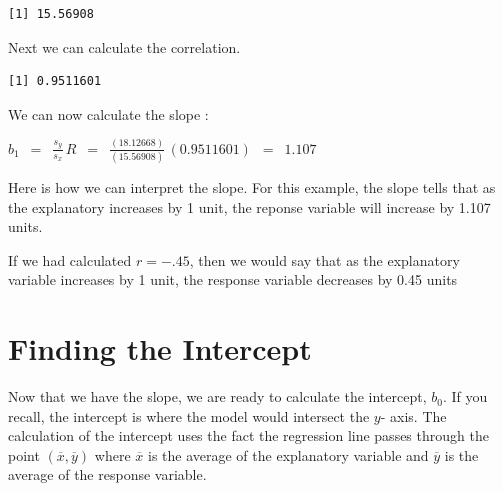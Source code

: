 \documentclass[
  letterpaper,
  DIV=11,
  numbers=noendperiod]{scrreprt}
\newenvironment{Shaded}{\begin{snugshade}}{\end{snugshade}}
\newcommand{\FunctionTok}[1]{\textcolor[rgb]{0.28,0.35,0.67}{#1}}
\newcommand{\NormalTok}[1]{\textcolor[rgb]{0.00,0.23,0.31}{#1}}
\newcommand{\SpecialCharTok}[1]{\textcolor[rgb]{0.37,0.37,0.37}{#1}}
\begin{document}
\begin{verbatim}
[1] 15.56908
\end{verbatim}

Next we can calculate the correlation.

\begin{Shaded}
\end{Shaded}

\begin{verbatim}
[1] 0.9511601
\end{verbatim}

We can now calculate the slope :

\(\displaystyle{b_1\,\,\, = \,\,\,\frac{s_y}{s_x}\, R\,\,\, =
\,\,\,\frac{(18.12668)}{(15.56908)}\,(0.9511601)\,\,\, =\,\,\, 1.107 }\)

\begin{tcolorbox}[enhanced jigsaw, breakable, arc=.35mm, leftrule=.75mm, toprule=.15mm, titlerule=0mm, coltitle=black, colframe=quarto-callout-tip-color-frame, left=2mm, opacitybacktitle=0.6, rightrule=.15mm, bottomrule=.15mm, colback=white, toptitle=1mm, opacityback=0, title=\textcolor{quarto-callout-tip-color}{\faLightbulb}\hspace{0.5em}{Interpreting the Slope}, bottomtitle=1mm, colbacktitle=quarto-callout-tip-color!10!white]

Here is how we can interpret the slope. For this example, the slope
tells that as the explanatory increases by 1 unit, the reponse variable
will increase by 1.107 units.

If we had calculated \(r = -.45\), then we would say that as the
explanatory variable increases by 1 unit, the response variable
decreases by 0.45 units

\end{tcolorbox}

\section*{Finding the Intercept}\label{finding-the-intercept}


Now that we have the slope, we are ready to calculate the intercept,
\(b_0\). If you recall, the intercept is where the model would intersect
the \(y\)- axis. The calculation of the intercept uses the fact the
regression line passes through the point
\(( \overline{x}, \overline{y})\) where \(\overline{x}\) is the average
of the explanatory variable and \(\overline{y}\) is the average of the
response variable.
\end{document}
